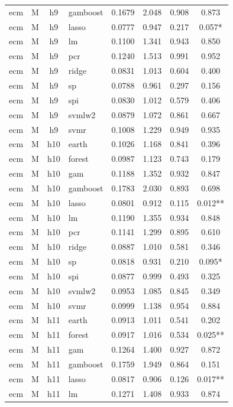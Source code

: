 \begin{ThreePartTable}
\begin{longtable}[t]{llclcccc}
ecm & M & h9 & gamboost & 0.1679 & 2.048 & 0.908 & 0.873\\
ecm & M & h9 & lasso & 0.0777 & 0.947 & 0.217 & 0.057*\\
ecm & M & h9 & lm & 0.1100 & 1.341 & 0.943 & 0.850\\
ecm & M & h9 & pcr & 0.1240 & 1.513 & 0.991 & 0.952\\
ecm & M & h9 & ridge & 0.0831 & 1.013 & 0.604 & 0.400\\
ecm & M & h9 & sp & 0.0788 & 0.961 & 0.297 & 0.156\\
ecm & M & h9 & spi & 0.0830 & 1.012 & 0.579 & 0.406\\
ecm & M & h9 & svmlw2 & 0.0879 & 1.072 & 0.861 & 0.667\\
ecm & M & h9 & svmr & 0.1008 & 1.229 & 0.949 & 0.935\\
\addlinespace
ecm & M & h10 & earth & 0.1026 & 1.168 & 0.841 & 0.396\\
ecm & M & h10 & forest & 0.0987 & 1.123 & 0.743 & 0.179\\
ecm & M & h10 & gam & 0.1188 & 1.352 & 0.932 & 0.847\\
ecm & M & h10 & gamboost & 0.1783 & 2.030 & 0.893 & 0.698\\
ecm & M & h10 & lasso & 0.0801 & 0.912 & 0.115 & 0.012**\\
ecm & M & h10 & lm & 0.1190 & 1.355 & 0.934 & 0.848\\
ecm & M & h10 & pcr & 0.1141 & 1.299 & 0.895 & 0.610\\
ecm & M & h10 & ridge & 0.0887 & 1.010 & 0.581 & 0.346\\
ecm & M & h10 & sp & 0.0818 & 0.931 & 0.210 & 0.095*\\
ecm & M & h10 & spi & 0.0877 & 0.999 & 0.493 & 0.325\\
ecm & M & h10 & svmlw2 & 0.0953 & 1.085 & 0.845 & 0.349\\
ecm & M & h10 & svmr & 0.0999 & 1.138 & 0.954 & 0.884\\
\addlinespace
ecm & M & h11 & earth & 0.0913 & 1.011 & 0.541 & 0.202\\
ecm & M & h11 & forest & 0.0917 & 1.016 & 0.534 & 0.025**\\
ecm & M & h11 & gam & 0.1264 & 1.400 & 0.927 & 0.872\\
ecm & M & h11 & gamboost & 0.1759 & 1.949 & 0.864 & 0.151\\
ecm & M & h11 & lasso & 0.0817 & 0.906 & 0.126 & 0.017**\\
ecm & M & h11 & lm & 0.1271 & 1.408 & 0.933 & 0.874\\

\end{longtable}
\end{ThreePartTable}
